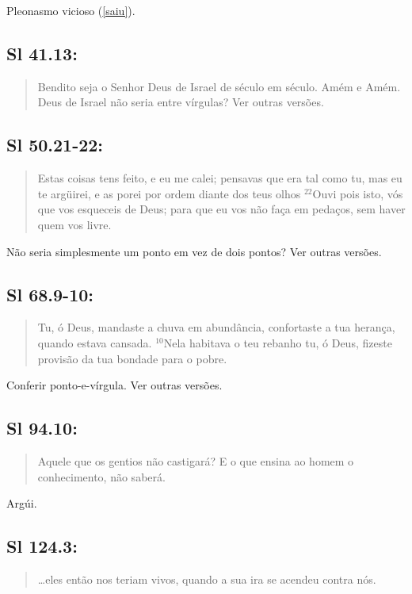 Pleonasmo vicioso (\ref{saiu}).

\subsection*{Sl 41.13:} 
 \begin{quote}
    \small
Bendito seja o Senhor Deus de Israel de século em século. Amém e Amém.
Deus de Israel não seria entre vírgulas? Ver outras versões. 
\end{quote}

\subsection*{Sl 50.21-22:} 
 \begin{quote}
    \small
Estas coisas tens feito, e eu me calei; pensavas que era tal como tu, mas eu te argüirei, e as porei por ordem diante dos teus olhos\uwave{:} $^{\mathrm{22}}$Ouvi pois isto, vós que vos esqueceis de Deus; para que eu vos não faça em pedaços, sem haver quem vos livre.
\end{quote}

Não seria simplesmente um ponto em vez de dois pontos? Ver outras versões. 

\subsection*{Sl 68.9-10:} 
 \begin{quote}
    \small
Tu, ó Deus, mandaste a chuva em abundância, confortaste a tua herança, quando estava cansada. $^{\mathrm{10}}$Nela habitava o teu rebanho\uwave{;} tu, ó Deus, fizeste provisão da tua bondade para o pobre.
\end{quote}

Conferir ponto-e-vírgula. Ver outras versões. 

\subsection*{Sl 94.10:} 
 \begin{quote}
    \small
Aquele que  os gentios não castigará? E o que ensina ao homem o conhecimento, não saberá.
\end{quote}

Argúi.

\subsection*{Sl 124.3:} 
 \begin{quote}
    \small
 \ldots eles então nos teriam  vivos, quando a sua ira se acendeu contra nós.
\end{quote}

